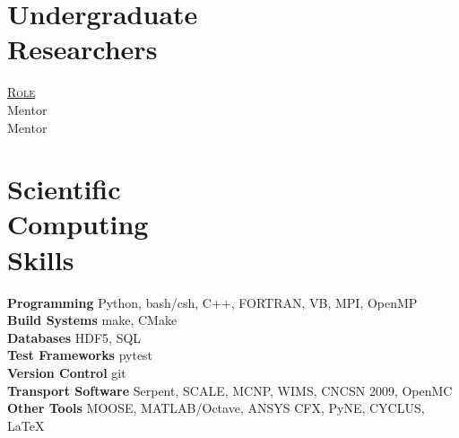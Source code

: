 \documentclass[margin,line]{resume}
\begin{document}
\begin{resume}
    \section{\mysidestyle Undergraduate\\Researchers}
    \hfill\textsc{\underline{Role}}\\
    \hfill Mentor\\
    \hfill Mentor\\
    \section{\mysidestyle Scientific\\Computing\\Skills}
                \textbf{Programming} \hfill Python, bash/csh, C++, FORTRAN, 
                VB, MPI, OpenMP \vspace{.5mm}\\%
                \textbf{Build Systems} \hfill make, CMake\vspace{.5mm}\\%
                \textbf{Databases} \hfill HDF5, SQL\vspace{.5mm}\\%
                \textbf{Test Frameworks} \hfill pytest\vspace{.5mm}\\%
                \textbf{Version Control} \hfill git\vspace{.5mm}\\%
                \textbf{Transport Software} \hfill Serpent, SCALE, MCNP, WIMS, CNCSN 2009,  
                OpenMC\vspace{.5mm}\\%
                \textbf{Other Tools} \hfill  MOOSE, MATLAB/Octave, ANSYS CFX, 
                PyNE, CYCLUS, \LaTeX \vspace{.5mm}%


\end{resume}
\end{document}
